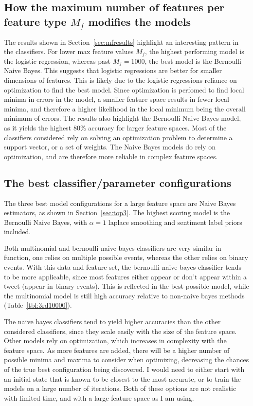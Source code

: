 \documentclass[11pt]{article}
\begin{document}
\subsection{How the maximum number of features per feature type $M_f$ modifies the models}
The results shown in Section~\ref{sec:mfresults} highlight an interesting pattern in the classifiers.
For lower max feature values $M_f$, the highest performing model is the logistic regression,
whereas past $M_f = 1000$, the best model is the Bernoulli Naive Bayes. 
This suggests that logistic regressions are better for smaller dimensions of features.
This is likely due to the logistic regressions reliance on optimization to find the best model.
Since optimization is perfomed to find local minima in errors in the model, 
a smaller feature space results in fewer local minima, 
and therefore a higher likelihood in the local minimum being the overall minimum of errors.
The results also highlight the Bernoulli Naive Bayes model, as it yields the highest 80\% accuracy for larger feature spaces.
Most of the classifiers considered rely on solving an optimization problem to determine a support vector, or a set of weights.
The Naive Bayes models do rely on optimization, and are therefore more reliable in complex feature spaces.

\subsection{The best classifier/parameter configurations}

The three best model configurations for a large feature space are Naive Bayes estimators, as shown in Section~\ref{sec:top3}.
The highest scoring model is the Bernoulli Naive Bayes, with $\alpha = 1$ laplace smoothing and sentiment label priors included.


Both multinomial and bernoulli naive bayes classifiers are very similar in function, one relies on multiple possible events, whereas the other relies on binary events.
With this data and feature set, the bernoulli naive bayes classifier tends to be more applicable, since most features either appear or don't appear within a tweet (appear in binary events).
This is reflected in the best possible model, while the multinomial model is still high accuracy relative to non-naive bayes methods (Table~\ref{tbl:3rd10000}).


The naive bayes classifiers tend to yield higher accuracies than the other considered classifiers, since they scale easily with the size of the feature space.
Other models rely on optimization, which increases in complexity with the feature space.
As more features are added, there will be a higher number of possible minima and maxima to consider when optimizing, decreasing the chances of the true best configuration being discovered.
I would need to either start with an initial state that is known to be closest to the most accurate, or to train the models on a large number of iterations.
Both of these options are not realistic with limited time, and with a large feature space as I am using.
\end{document}
